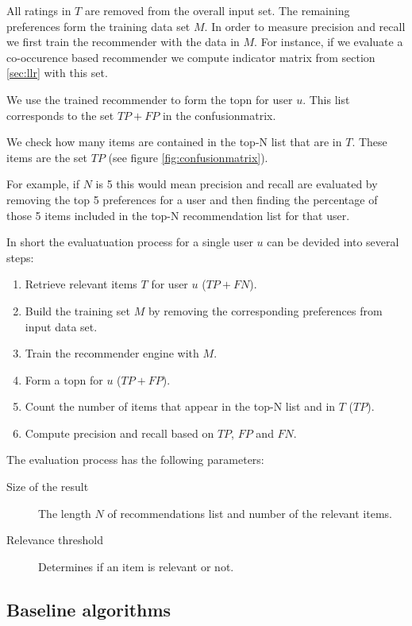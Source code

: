 All ratings in $T$ are removed from the overall input set. The remaining preferences form the training data set $M$. In order to measure precision and recall we first train the recommender with the data in $M$. For instance, if we evaluate a co-occurence based recommender we compute indicator matrix from section \ref{sec:llr} with this set.

We use the trained recommender to form the \gls{topn} for user $u$. This list corresponds to the set $TP + FP$ in the confusionmatrix.

We check how many items are contained in the top-N list that are in $T$. These items are the set $TP$ (see figure \ref{fig:confusionmatrix}). 

For example, if $N$ is 5 this would mean \gls{precision} and \gls{recall} are evaluated by removing the top 5 preferences for a user and then finding the percentage of those 5 items included in the top-N recommendation list for that user. 

In short the evaluatuation process for a single user $u$ can be devided into several steps:
\begin{enumerate}
\item Retrieve relevant items $T$ for user $u$ ($TP+FN$).
\item Build the training set $M$ by removing the corresponding preferences from input data set.
\item Train the recommender engine with $M$.
\item Form a \gls{topn} for $u$ ($TP+FP$).
\item Count the number of items that appear in the top-N list and in $T$ ($TP$).
\item Compute precision and recall based on $TP$, $FP$ and $FN$.
\end{enumerate}

The evaluation process has the following parameters:
\begin{description}
\item[Size of the result] The length $N$ of recommendations list and number of the relevant items. 
\item[Relevance threshold] Determines if an item is relevant or not.
\end{description}

\subsection{Baseline algorithms}
\label{sec:baseline}


